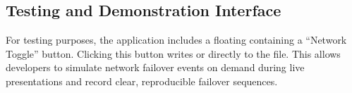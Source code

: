 \subsection{Testing and Demonstration Interface}
For testing purposes, the application includes a floating  containing a ``Network Toggle'' button. Clicking this button writes  or  directly to the  file. This allows developers to simulate network failover events on demand during live presentations and record clear, reproducible failover sequences.

